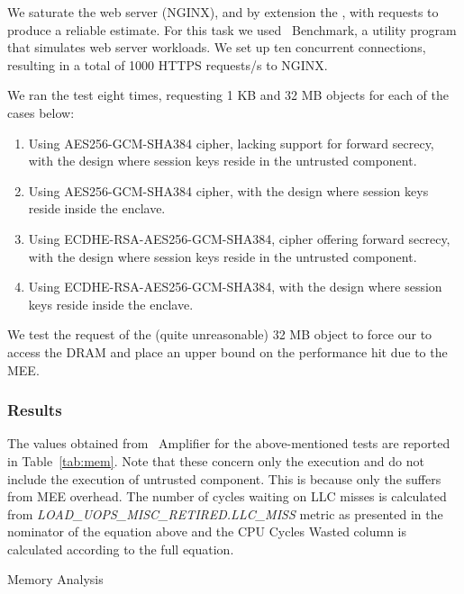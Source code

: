 \documentclass[../../../main.tex]{subfiles}
\begin{document}
We saturate the web server (NGINX), and by extension the \enclavemodel, with
requests to produce a reliable estimate. For this task we used
\Apache~Benchmark, a utility program that simulates web server workloads. We
set up ten concurrent connections, resulting in a total of 1000 HTTPS
requests/s to NGINX.

We ran the test eight times, requesting 1 KB and 32 MB objects for each of the
cases below:
\begin{enumerate}
  \item Using AES256-GCM-SHA384 cipher, lacking support for forward secrecy,
    with the design where session keys reside in the untrusted component.
  \item Using AES256-GCM-SHA384 cipher, with the design where session keys
    reside inside the enclave.
  \item Using ECDHE-RSA-AES256-GCM-SHA384, cipher offering forward secrecy, with
    the design where session keys reside in the untrusted component.
  \item Using ECDHE-RSA-AES256-GCM-SHA384, with the design where session keys
    reside inside the enclave.
\end{enumerate}

We test the request of the (quite unreasonable) 32 MB object to force our
\enclavemodel to access the DRAM and place an upper bound on the performance
hit due to the MEE.

\subsubsection*{Results}
The values obtained from \VTune~Amplifier for the above-mentioned tests are
reported in Table~\ref{tab:mem}. Note that these concern only the \enclavemodel
execution and do not include the execution of untrusted component. This is
because only the \enclaveprogram suffers from MEE overhead. The number of
cycles waiting on LLC misses is calculated from
\textit{LOAD\_UOPS\_MISC\_RETIRED.LLC\_MISS} metric as presented in the
nominator of the equation above and the CPU Cycles Wasted column is calculated
according to the full equation.

\begin{table}[H]
  \caption{Memory Analysis}
  \label{tab:mem}
\end{table}
\end{document}
